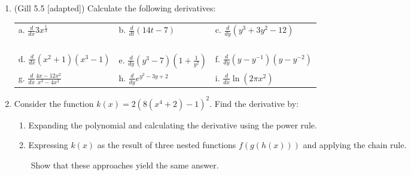 \documentclass[11pt]{article}
\begin{document}
\begin{enumerate}
\item (Gill 5.5 [adapted]) Calculate the following derivatives:
\begin{center}
\begin{tabular}{p{4cm}p{4cm}p{4cm}}
a. $\frac{d}{dx} 3x^{\frac{1}{3}}$      &  b. $\frac{d}{dt}(14t - 7)$      & c. $\frac{d}{dy}(y^3 + 3y^2 - 12)$                     \rule{0cm}{1cm}\\
\vspace{30pt}         & \vspace{30pt}       & \vspace{30pt} \\
\vspace{30pt}         & \vspace{30pt}       & \vspace{30pt} \\
\vspace{30pt}         & \vspace{30pt}       & \vspace{30pt} \\
\vspace{30pt}         & \vspace{30pt}       & \vspace{30pt} \\
d. $\frac{d}{dx}(x^2 + 1)(x^3 - 1)$    &  e. $\frac{d}{dy}(y^3 - 7)(1 + \frac{1}{y^2})$ & f. $\frac{d}{dy}(y - y^{-1})(y - y^{-2})$ \rule{0cm}{1cm}\\
g. $\frac{d}{dx}\frac{4x - 12x^2}{x^3-4x^2}$ & h. $\frac{d}{dy}e^{y^2 - 3y + 2}$   & i. $\frac{d}{dx}\ln (2\pi x^2)$ \rule{0cm}{1cm}\\
\end{tabular}
\end{center}

\vspace{.5cm}

\item Consider the function $k(x) = 2(8(x^4 + 2) - 1)^2$.  Find the derivative by:
\begin{enumerate}
\item Expanding the polynomial and calculating the derivative using the power rule.
\item Expressing $k(x)$ as the result of three nested functions $f(g(h(x)))$ and applying the chain rule.
\end{enumerate}
~~~~Show that these approaches yield the same answer.


\end{enumerate}
\end{document}
